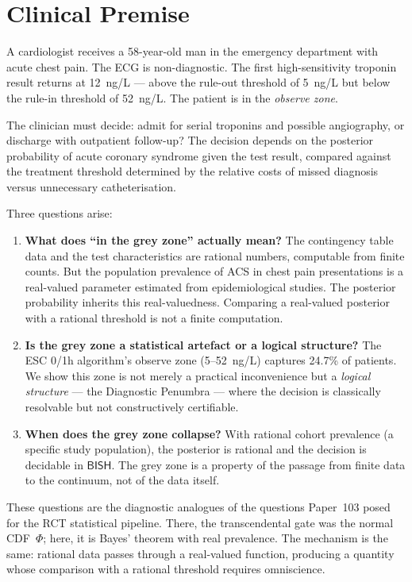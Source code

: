\documentclass[11pt,a4paper]{article}
\theoremstyle{plain}
\theoremstyle{definition}
\newcommand{\BISH}{\textsf{BISH}}
\begin{document}
\section{Clinical Premise}\label{sec:premise}

A cardiologist receives a 58-year-old man in the emergency department with acute chest pain.  The ECG is non-diagnostic.  The first high-sensitivity troponin result returns at 12~ng/L --- above the rule-out threshold of 5~ng/L but below the rule-in threshold of 52~ng/L.  The patient is in the \emph{observe zone}.

The clinician must decide: admit for serial troponins and possible angiography, or discharge with outpatient follow-up?  The decision depends on the posterior probability of acute coronary syndrome given the test result, compared against the treatment threshold determined by the relative costs of missed diagnosis versus unnecessary catheterisation.

Three questions arise:

\begin{enumerate}[nosep]
\item \textbf{What does ``in the grey zone'' actually mean?}  The contingency table data and the test characteristics are rational numbers, computable from finite counts.  But the population prevalence of ACS in chest pain presentations is a real-valued parameter estimated from epidemiological studies.  The posterior probability inherits this real-valuedness.  Comparing a real-valued posterior with a rational threshold is not a finite computation.

\item \textbf{Is the grey zone a statistical artefact or a logical structure?}  The ESC 0/1h algorithm's observe zone (5--52~ng/L) captures 24.7\% of patients.  We show this zone is not merely a practical inconvenience but a \emph{logical structure} --- the Diagnostic Penumbra --- where the decision is classically resolvable but not constructively certifiable.

\item \textbf{When does the grey zone collapse?}  With rational cohort prevalence (a specific study population), the posterior is rational and the decision is decidable in $\BISH$.  The grey zone is a property of the passage from finite data to the continuum, not of the data itself.
\end{enumerate}

These questions are the diagnostic analogues of the questions Paper~103 posed for the RCT statistical pipeline.  There, the transcendental gate was the normal CDF~$\Phi$; here, it is Bayes' theorem with real prevalence.  The mechanism is the same: rational data passes through a real-valued function, producing a quantity whose comparison with a rational threshold requires omniscience.
\end{document}
